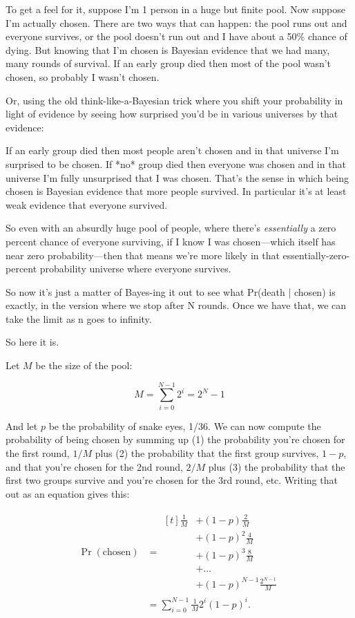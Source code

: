\documentclass[article,twocolumn]{memoir}
\begin{document}
To get a feel for it, suppose I'm 1 person in a huge but finite pool. 
Now suppose I'm actually chosen. 
There are two ways that can happen: 
the pool runs out and everyone survives, or 
the pool doesn't run out and I have about a 50\% chance of dying. 
But knowing that I'm chosen is Bayesian evidence that we had many, many rounds of survival. 
If an early group died then most of the pool wasn't chosen, so probably I wasn't chosen.

Or, using the old think-like-a-Bayesian trick where you shift your probability in light of evidence by seeing how surprised you'd be in various universes by that evidence:

If an early group died then most people aren't chosen and in that universe I'm surprised to be chosen. 
If *no* group died then everyone was chosen and in that universe I'm fully unsurprised that I was chosen. 
That's the sense in which being chosen is Bayesian evidence that more people survived. 
In particular it's at least weak evidence that everyone survived.

So even with an absurdly huge pool of people, where there's \emph{essentially} a zero percent chance of everyone surviving, if I know I was chosen---which itself has near zero probability---then that means we're more likely in that essentially-zero-percent probability universe where everyone survives.

So now it's just a matter of Bayes-ing it out to see what Pr(death | chosen) is exactly, in the version where we stop after N rounds.
Once we have that, we can take the limit as n goes to infinity.

So here it is.

Let $M$ be the size of the pool:

$$M = \sum_{i=0}^{N-1} 2^i = 2^N-1$$

And let $p$ be the probability of snake eyes, 1/36.
We can now compute the probability of being chosen by summing up 
(1) the probability you're chosen for the first round, $1/M$ plus 
(2) the probability that the first group survives, $1-p$, and that you're chosen for the 2nd round, $2/M$ plus 
(3) the probability that the first two groups survive and you're chosen for the 3rd round, etc.
Writing that out as an equation gives this:

\begin{align*}
\Pr(\text{chosen}) & = 
\begin{aligned}[t]
\tfrac{1}{M} & + (1-p)\tfrac{2}{M} \\
& + (1-p)^2\tfrac{4}{M} \\
& + (1-p)^3\tfrac{8}{M} \\
& + \ldots \\
& + (1-p)^{N-1}\frac{2^{N-1}}{M}
\end{aligned} \\
& = \sum_{i=0}^{N-1} \tfrac{1}{M} 2^i(1-p)^i.
\end{align*}
\end{document}
